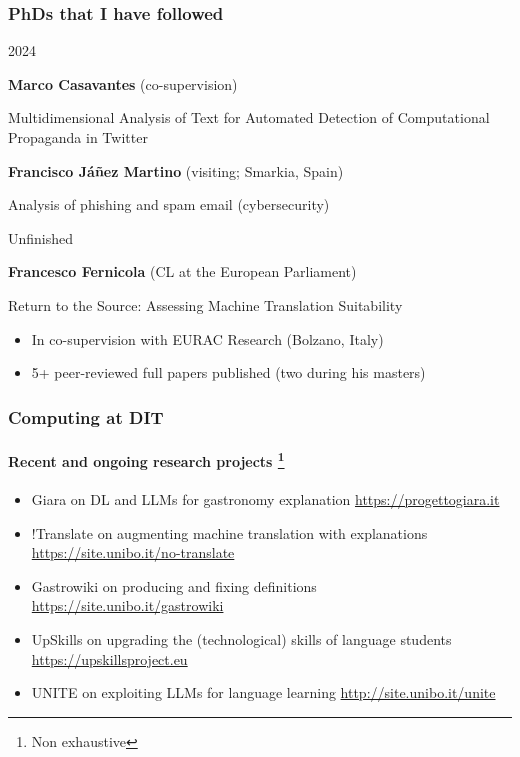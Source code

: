 \documentclass[xcolor=x11names,handout]{beamer}
\newcommand{\light}[1]{\textcolor{gray}{#1}}
\begin{document}
\begin{frame}
\frametitle{PhDs that I have followed}

\alert{2024}

\textbf{Marco Casavantes} (co-supervision)

Multidimensional Analysis of Text for Automated Detection of Computational
Propaganda in Twitter
\bigskip

\textbf{Francisco J\'a\~nez Martino} (visiting; Smarkia, Spain)

Analysis of phishing and spam email (cybersecurity)
\bigskip 	\pause

\alert{Unfinished}

\textbf{Francesco Fernicola} (CL at the European Parliament)

Return to the Source: Assessing Machine Translation Suitability


\begin{itemize}
 \item In co-supervision with EURAC Research (Bolzano, Italy)
 \item 5+ peer-reviewed full papers published (two during his masters)
\end{itemize}


\end{frame}


\begin{frame}
\frametitle{Computing at DIT}
\framesubtitle{Recent and ongoing research projects%
\footnote{Non exhaustive}}

\begin{itemize}


\item \alert{Giara} on DL and LLMs for gastronomy explanation
 \light{\url{https://progettogiara.it}}
\bigskip	\pause

 \item \alert{!Translate} on augmenting machine translation with explanations
 \light{\url{https://site.unibo.it/no-translate}}
\bigskip	\pause

 \item \alert{Gastrowiki} on producing and fixing definitions
	\light{\url{https://site.unibo.it/gastrowiki}}
\bigskip 		\pause

\item \alert{UpSkills} on upgrading the (technological) skills of language
students
	\light{\url{https://upskillsproject.eu}}
\bigskip	\pause

 \item \alert{UNITE} on exploiting LLMs for language learning
 	\light{\url{http://site.unibo.it/unite}}

\end{itemize}
\end{frame}
\end{document}

